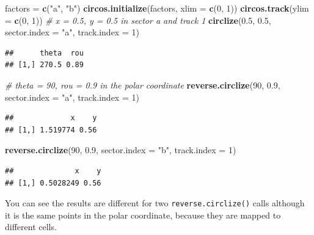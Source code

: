 \documentclass[]{book}
\newenvironment{Shaded}{\begin{snugshade}}{\end{snugshade}}
\newcommand{\KeywordTok}[1]{\textcolor[rgb]{0.13,0.29,0.53}{\textbf{#1}}}
\newcommand{\DataTypeTok}[1]{\textcolor[rgb]{0.13,0.29,0.53}{#1}}
\newcommand{\DecValTok}[1]{\textcolor[rgb]{0.00,0.00,0.81}{#1}}
\newcommand{\FloatTok}[1]{\textcolor[rgb]{0.00,0.00,0.81}{#1}}
\newcommand{\StringTok}[1]{\textcolor[rgb]{0.31,0.60,0.02}{#1}}
\newcommand{\CommentTok}[1]{\textcolor[rgb]{0.56,0.35,0.01}{\textit{#1}}}
\newcommand{\NormalTok}[1]{#1}
\theoremstyle{definition}
\theoremstyle{definition}
\theoremstyle{remark}
\begin{document}
\begin{Shaded}
\begin{Highlighting}[]
\NormalTok{factors =}\StringTok{ }\KeywordTok{c}\NormalTok{(}\StringTok{"a"}\NormalTok{, }\StringTok{"b"}\NormalTok{)}
\KeywordTok{circos.initialize}\NormalTok{(factors, }\DataTypeTok{xlim =} \KeywordTok{c}\NormalTok{(}\DecValTok{0}\NormalTok{, }\DecValTok{1}\NormalTok{))}
\KeywordTok{circos.track}\NormalTok{(}\DataTypeTok{ylim =} \KeywordTok{c}\NormalTok{(}\DecValTok{0}\NormalTok{, }\DecValTok{1}\NormalTok{))}
\CommentTok{# x = 0.5, y = 0.5 in sector a and track 1}
\KeywordTok{circlize}\NormalTok{(}\FloatTok{0.5}\NormalTok{, }\FloatTok{0.5}\NormalTok{, }\DataTypeTok{sector.index =} \StringTok{"a"}\NormalTok{, }\DataTypeTok{track.index =} \DecValTok{1}\NormalTok{)}
\end{Highlighting}
\end{Shaded}

\begin{verbatim}
##      theta  rou
## [1,] 270.5 0.89
\end{verbatim}

\begin{Shaded}
\begin{Highlighting}[]
\CommentTok{# theta = 90, rou = 0.9 in the polar coordinate}
\KeywordTok{reverse.circlize}\NormalTok{(}\DecValTok{90}\NormalTok{, }\FloatTok{0.9}\NormalTok{, }\DataTypeTok{sector.index =} \StringTok{"a"}\NormalTok{, }\DataTypeTok{track.index =} \DecValTok{1}\NormalTok{)}
\end{Highlighting}
\end{Shaded}

\begin{verbatim}
##             x    y
## [1,] 1.519774 0.56
\end{verbatim}

\begin{Shaded}
\begin{Highlighting}[]
\KeywordTok{reverse.circlize}\NormalTok{(}\DecValTok{90}\NormalTok{, }\FloatTok{0.9}\NormalTok{, }\DataTypeTok{sector.index =} \StringTok{"b"}\NormalTok{, }\DataTypeTok{track.index =} \DecValTok{1}\NormalTok{)}
\end{Highlighting}
\end{Shaded}

\begin{verbatim}
##              x    y
## [1,] 0.5028249 0.56
\end{verbatim}

You can see the results are different for two
\texttt{reverse.circlize()} calls although it is the same points in the
polar coordinate, because they are mapped to different cells.
\end{document}
